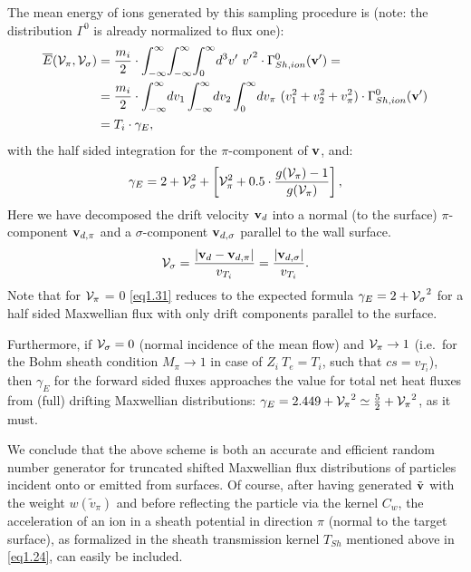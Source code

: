 The mean energy of ions generated by this sampling procedure is (note: the
distribution $\Gamma^0$ is  already normalized to flux one):
\begin{align}
  \nonumber
  \overline{E}
  ({\cal V}_{\pi},{\cal V}_{\sigma}) & = \frac{m_i}{2}	  \cdot
  \int^\infty_{-\infty} \! \int^\infty_{-\infty} \! \int^\infty_{0} \! d^3v' \
  {v'}^2	    \cdot \Gamma^0_{Sh,ion} (\mathbf{v} ' ) =                \\
                                     & = \frac{m_i}{2}	  \cdot
  \int^\infty_{-\infty} \!dv_1
  \int^\infty_{-\infty} \!dv_2 \int^\infty_{0} \!
  dv_\pi \
  (v_1^2+v_2^2+v_\pi^2)    \cdot
  \Gamma^0_{Sh,ion}
  (\mathbf{v} ' ) \label{eq1.30}
  \\
  \nonumber
                                     & = T_i	\cdot	\gamma_E,
\end{align}
with the half sided integration for the $\pi$-component of
$\mathbf{v}$, and:
\begin{equation}
  \gamma_E = 2 + {\cal V}_\sigma^2    + \left[{\cal V}_\pi^2	+   0.5
    \cdot \frac{g({\cal V}_{\pi} )  - 1}{g({\cal V}_{\pi} )}\right],
  \label{eq1.31}
\end{equation}
Here we have decomposed the drift velocity $\mathbf{v}_d$ into a normal (to the
surface) $\pi$-component $\mathbf{v}_{d,\pi}$ and a $\sigma$-component
$\mathbf{v}_{d,\sigma}$ parallel to the wall surface.
\begin{equation}{\cal V}_{\sigma} = \frac{| \mathbf{v}_d   -	\mathbf{v}_{d, \pi} |}
  {v_{T_i}} = \frac{| \mathbf{v}_{d,\sigma} |} {v_{T_i}}. \label{eq1.32}
\end{equation}
Note that for ${\cal V}_{\pi}$ = 0 \cref{eq1.31} reduces to the expected
formula $\gamma_E = 2  + {{\cal V}_{\sigma}}^2$  for a half sided Maxwellian
flux with only drift components parallel to the surface.

Furthermore, if ${\cal V}_{\sigma} = 0$ (normal incidence of the mean flow) and
${\cal V}_{\pi} \rightarrow 1$ (i.e.\ for the Bohm sheath condition $M_{\pi}
  \rightarrow 1$ in case of $Z_i~T_e = T_i$, such that $cs = v_{T_i}$), then
$\gamma_E$ for the forward sided fluxes approaches the value for total net heat
fluxes from (full) drifting Maxwellian distributions:
$\gamma_E = 2.449 + {{\cal V}_{\pi}}^2 \simeq \frac {5}{2} + {{\cal
      V}_{\pi}}^2$, as it must.

We conclude that the above scheme is both an accurate and efficient random
number generator for truncated shifted Maxwellian flux distributions of
particles incident onto or emitted from surfaces.
Of course, after having generated $ \tilde{\mathbf{v}}  $ with the weight $ w
  ({\tilde{v}}_{\pi} )$ and before reflecting the particle via the kernel $C_w $,
the acceleration of an ion in a sheath potential  in direction $\pi$ (normal to
the target surface), as formalized in the sheath transmission kernel $T_{Sh}$
mentioned above in \cref{eq1.24}, can easily be included.

